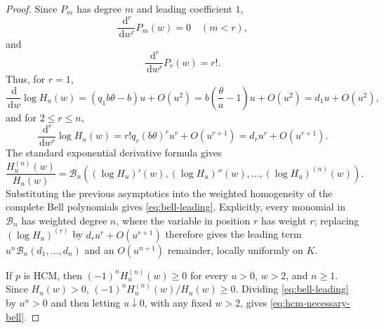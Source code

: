 \documentclass[10pt,a4paper]{amsart}
\newcommand{\dd}{\,\mathrm{d}}
\begin{document}
\begin{proof}
Since \(P_m\) has degree \(m\) and leading coefficient \(1\),
\begin{equation}
\frac{\dd^r}{\dd w^r}P_m(w)=0
\quad(m<r),
\end{equation}
and
\begin{equation}
\frac{\dd^r}{\dd w^r}P_r(w)=r!.
\end{equation}
Thus, for \(r=1\),
\begin{equation}
\frac{\dd}{\dd w}\log H_u(w)
=
\left(q_1b\theta-b\right)u+O(u^2)
=
b\left(\frac{\theta}{a}-1\right)u+O(u^2)
=
d_1u+O(u^2),
\end{equation}
and for \(2\le r\le n\),
\begin{equation}
\frac{\dd^r}{\dd w^r}\log H_u(w)
=
r!q_r(b\theta)^r u^r+O(u^{r+1})
=
d_ru^r+O(u^{r+1}).
\end{equation}
The standard exponential derivative formula gives
\begin{equation}
\frac{H_u^{(n)}(w)}{H_u(w)}
=
\mathcal B_n
\left(
(\log H_u)'(w),
(\log H_u)''(w),
\dots,
(\log H_u)^{(n)}(w)
\right).
\end{equation}
Substituting the previous asymptotics into the weighted homogeneity of the complete Bell polynomials gives \eqref{eq:bell-leading}.  Explicitly, every monomial in \(\mathcal B_n\) has weighted degree \(n\), where the variable in position \(r\) has weight \(r\); replacing \((\log H_u)^{(r)}\) by \(d_ru^r+O(u^{r+1})\) therefore gives the leading term \(u^n\mathcal B_n(d_1,\dots,d_n)\) and an \(O(u^{n+1})\) remainder, locally uniformly on \(K\).

If \(p\) is HCM, then \((-1)^nH_u^{(n)}(w)\ge0\) for every \(u>0\), \(w>2\), and \(n\ge1\).  Since \(H_u(w)>0\), \((-1)^nH_u^{(n)}(w)/H_u(w)\ge0\).  Dividing \eqref{eq:bell-leading} by \(u^n>0\) and then letting \(u\downarrow0\), with any fixed \(w>2\), gives \eqref{eq:hcm-necessary-bell}.
\end{proof}
\end{document}
